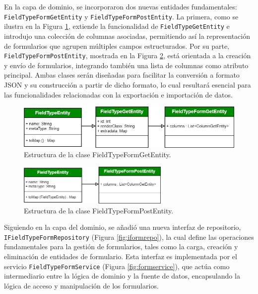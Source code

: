 \documentclass{article}
\begin{document}
En la capa de dominio, se incorporaron dos nuevas entidades fundamentales: \texttt{FieldTypeFormGetEntity} y \texttt{FieldTypeFormPostEntity}. La primera, como se ilustra en la Figura \ref{fig:fieldtypeformgetentity}, extiende la funcionalidad de \texttt{FieldTypeGetEntity} e introdujo una colección de columnas asociadas, permitiendo así la representación de formularios que agrupen múltiples campos estructurados. Por su parte, \texttt{FieldTypeFormPostEntity}, mostrada en la Figura \ref{fig:fieldtypeformpostentity}, está orientada a la creación y envío de formularios, integrando también una lista de columnas como atributo principal. Ambas clases serán diseñadas para facilitar la conversión a formato JSON y su construcción a partir de dicho formato, lo cual resultará esencial para las funcionalidades relacionadas con la exportación e importación de datos.

\begin{figure}[H]
  \centering
  \includegraphics[width=\textwidth]{images/fieldtypeform_get_entity.png}
  \caption{Estructura de la clase FieldTypeFormGetEntity.}
  \label{fig:fieldtypeformgetentity}
\end{figure}

\begin{figure}[H]
  \centering
  \includegraphics[width=0.65\textwidth]{images/fieldtypeform_post_entity.png}
  \caption{Estructura de la clase FieldTypeFormPostEntity.}
  \label{fig:fieldtypeformpostentity}
\end{figure}

Siguiendo en la capa del dominio, se añadió una nueva interfaz de repositorio, \texttt{IFieldTypeFormRepository} (Figura \ref{fig:iformrepo}), la cual define las operaciones fundamentales para la gestión de formularios, tales como la carga, creación y eliminación de entidades de formulario. Esta interfaz es implementada por el servicio \texttt{FieldTypeFormService} (Figura \ref{fig:formservice}), que actúa como intermediario entre la lógica de dominio y la fuente de datos, encapsulando la lógica de acceso y manipulación de los formularios.
\end{document}
